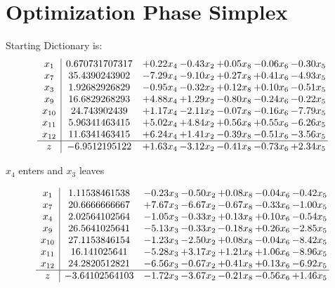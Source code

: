 \documentclass[9pt]{article}
\begin{document}
\section{Optimization Phase Simplex}
Starting Dictionary is:
\[\begin{array}{c| c c@{\hskip 2pt} c@{\hskip 2pt} c@{\hskip 2pt} c@{\hskip 2pt} c@{\hskip 2pt} }
 x_{1}   &  0.670731707317 & +  0.22 x_{4} & -0.43 x_{2} & +  0.05 x_{8} & -0.06 x_{6} & -0.30 x_{5}\\
 x_{7}   &  35.4390243902 & -7.29 x_{4} & -9.10 x_{2} & +  0.27 x_{8} & +  0.41 x_{6} & -4.93 x_{5}\\
 x_{3}   &  1.92682926829 & -0.95 x_{4} & -0.32 x_{2} & +  0.12 x_{8} & +  0.10 x_{6} & -0.51 x_{5}\\
 x_{9}   &  16.6829268293 & +  4.88 x_{4} & +  1.29 x_{2} & -0.80 x_{8} & -0.24 x_{6} & -0.22 x_{5}\\
 x_{10}   &  24.743902439 & +  1.17 x_{4} & -2.11 x_{2} & -0.07 x_{8} & -0.16 x_{6} & -7.79 x_{5}\\
 x_{11}   &  5.96341463415 & +  5.02 x_{4} & +  4.84 x_{2} & +  0.56 x_{8} & +  0.55 x_{6} & -6.26 x_{5}\\
 x_{12}   &  11.6341463415 & +  6.24 x_{4} & +  1.41 x_{2} & -0.39 x_{8} & -0.51 x_{6} & -3.56 x_{5}\\
\hline
z    &  -6.9512195122 & +  1.63 x_{4} & -3.12 x_{2} & -0.41 x_{8} & -0.73 x_{6} & +  2.34 x_{5}\\
\end{array}\]


 $ x_{4} $ enters and $ x_{3} $ leaves 

 \[\begin{array}{c| c c@{\hskip 2pt} c@{\hskip 2pt} c@{\hskip 2pt} c@{\hskip 2pt} c@{\hskip 2pt} }
 x_{1}   &  1.11538461538 & -0.23 x_{3} & -0.50 x_{2} & +  0.08 x_{8} & -0.04 x_{6} & -0.42 x_{5}\\
 x_{7}   &  20.6666666667 & +  7.67 x_{3} & -6.67 x_{2} & -0.67 x_{8} & -0.33 x_{6} & -1.00 x_{5}\\
 x_{4}   &  2.02564102564 & -1.05 x_{3} & -0.33 x_{2} & +  0.13 x_{8} & +  0.10 x_{6} & -0.54 x_{5}\\
 x_{9}   &  26.5641025641 & -5.13 x_{3} & -0.33 x_{2} & -0.18 x_{8} & +  0.26 x_{6} & -2.85 x_{5}\\
 x_{10}   &  27.1153846154 & -1.23 x_{3} & -2.50 x_{2} & +  0.08 x_{8} & -0.04 x_{6} & -8.42 x_{5}\\
 x_{11}   &  16.141025641 & -5.28 x_{3} & +  3.17 x_{2} & +  1.21 x_{8} & +  1.06 x_{6} & -8.96 x_{5}\\
 x_{12}   &  24.2820512821 & -6.56 x_{3} & -0.67 x_{2} & +  0.41 x_{8} & +  0.13 x_{6} & -6.92 x_{5}\\
\hline
z    &  -3.64102564103 & -1.72 x_{3} & -3.67 x_{2} & -0.21 x_{8} & -0.56 x_{6} & +  1.46 x_{5}\\
\end{array}\]
\end{document}

